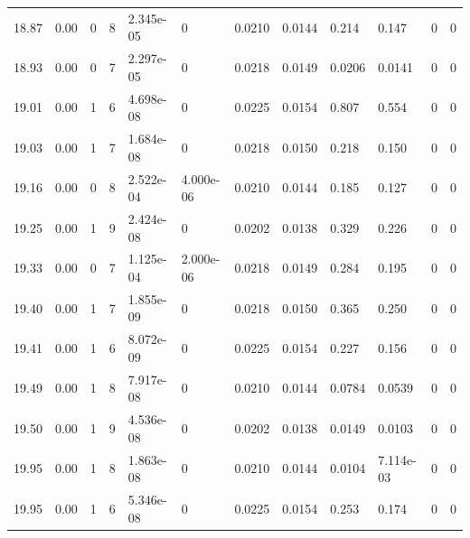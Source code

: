 \documentclass[preview]{standalone}
\begin{document}
{{{{{\begin{tabular}{L{1.2cm}C{1.2cm} C{0.3cm}C{0.5cm} C{1.4cm}C{1.4cm} C{1.4cm}C{1.4cm} C{1.6cm}C{1.6cm} C{1.6cm}C{1.6cm}}
  18.87  &  0.00  & 0     &  8 &  2.345e-05  & 0  &  0.0210&   0.0144& 0.214 & 0.147   &  0 & 0  \\ 
  18.93  &  0.00  & 0     &  7 &  2.297e-05  & 0  &  0.0218&   0.0149& 0.0206 & 0.0141   &  0 & 0  \\ 
  19.01  &  0.00  & 1     &  6 &  4.698e-08  & 0  &  0.0225&   0.0154& 0.807 & 0.554   &  0 & 0  \\ 
  19.03  &  0.00  & 1     &  7 &  1.684e-08  & 0  &  0.0218&   0.0150& 0.218 & 0.150   &  0 & 0  \\ 
  19.16  &  0.00  & 0     &  8 &  2.522e-04  & 4.000e-06  &  0.0210&   0.0144& 0.185 & 0.127   &  0 & 0  \\ 
  19.25  &  0.00  & 1     &  9 &  2.424e-08  & 0  &  0.0202&   0.0138& 0.329 & 0.226   &  0 & 0  \\ 
  19.33  &  0.00  & 0     &  7 &  1.125e-04  & 2.000e-06  &  0.0218&   0.0149& 0.284 & 0.195   &  0 & 0  \\ 
  19.40  &  0.00  & 1     &  7 &  1.855e-09  & 0  &  0.0218&   0.0150& 0.365 & 0.250   &  0 & 0  \\ 
  19.41  &  0.00  & 1     &  6 &  8.072e-09  & 0  &  0.0225&   0.0154& 0.227 & 0.156   &  0 & 0  \\ 
  19.49  &  0.00  & 1     &  8 &  7.917e-08  & 0  &  0.0210&   0.0144& 0.0784 & 0.0539   &  0 & 0  \\ 
  19.50  &  0.00  & 1     &  9 &  4.536e-08  & 0  &  0.0202&   0.0138& 0.0149 & 0.0103   &  0 & 0  \\ 
  19.95  &  0.00  & 1     &  8 &  1.863e-08  & 0  &  0.0210&   0.0144& 0.0104 & 7.114e-03   &  0 & 0  \\ 
  19.95  &  0.00  & 1     &  6 &  5.346e-08  & 0  &  0.0225&   0.0154& 0.253 & 0.174   &  0 & 0  \\ 
\hline 
\end{tabular} 

}}}}}
\end{document}
